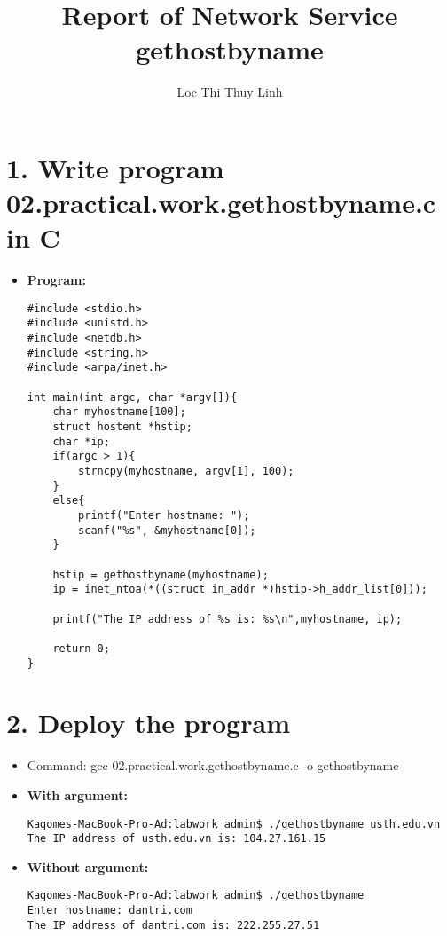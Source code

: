 \documentclass[11pt, oneside]{report}
\title{Report of Network Service\\
gethostbyname}
\author{Loc Thi Thuy Linh}
\begin{document}
\maketitle

\section*{1. Write program 02.practical.work.gethostbyname.c in C}

\begin{itemize}
 \item \textbf{Program:} 
 \begin{lstlisting}
#include <stdio.h>
#include <unistd.h>
#include <netdb.h>
#include <string.h>
#include <arpa/inet.h>

int main(int argc, char *argv[]){
    char myhostname[100];
    struct hostent *hstip;
    char *ip;
    if(argc > 1){
        strncpy(myhostname, argv[1], 100);
    }
    else{
        printf("Enter hostname: ");
        scanf("%s", &myhostname[0]);
    }
    
    hstip = gethostbyname(myhostname);
    ip = inet_ntoa(*((struct in_addr *)hstip->h_addr_list[0]));
    
    printf("The IP address of %s is: %s\n",myhostname, ip);

    return 0;
}
\end{lstlisting}
\end{itemize}

\section*{2. Deploy the program}
\begin{itemize}
\item Command: gcc 02.practical.work.gethostbyname.c -o gethostbyname
\item \textbf{With argument:} \\
\begin{lstlisting}
Kagomes-MacBook-Pro-Ad:labwork admin$ ./gethostbyname usth.edu.vn
The IP address of usth.edu.vn is: 104.27.161.15
\end{lstlisting}

\item \textbf{Without argument:}

\begin{lstlisting}
Kagomes-MacBook-Pro-Ad:labwork admin$ ./gethostbyname
Enter hostname: dantri.com
The IP address of dantri.com is: 222.255.27.51
\end{lstlisting}

\end{itemize}
\end{document}
